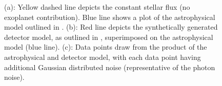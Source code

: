 \documentclass[twocolumn]{aastex61}
\begin{document}
\begin{figure}




\caption{\small (a): Yellow dashed line depicts the constant stellar flux (no exoplanet contribution). Blue line shows a plot of the astrophysical model outlined in \citet{schwartz2016}. (b): Red line depicts the synthetically generated detector model, as outlined in \citet{grillmair2014}, superimposed on the astrophysical model (blue line). (c): Data points draw from the product of the astrophysical and detector model, with each data point having additional Gaussian distributed noise (representative of the photon noise).}
\label{fig:synthetic_data}
\end{figure}
\end{document}
